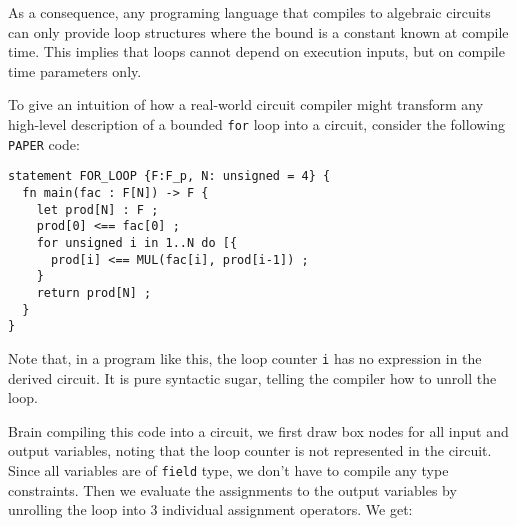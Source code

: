 As a consequence, any programing language that compiles to algebraic circuits can only provide loop structures where the bound is a constant known at compile time. This implies that loops cannot depend on execution inputs, but on compile time parameters only.  
\begin{example} To give an intuition of how a real-world circuit compiler might transform any high-level description of a bounded \texttt{for} loop into a circuit, consider the following \texttt{PAPER} code:
\begin{lstlisting}
statement FOR_LOOP {F:F_p, N: unsigned = 4} {
  fn main(fac : F[N]) -> F {
  	let prod[N] : F ;
  	prod[0] <== fac[0] ;
    for unsigned i in 1..N do [{
      prod[i] <== MUL(fac[i], prod[i-1]) ; 
    }
    return prod[N] ;
  }
}
\end{lstlisting}
Note that, in a program like this, the loop counter \texttt{i} has no expression in the derived circuit. It is pure syntactic sugar, telling the compiler how to unroll the loop.

Brain compiling this code into a circuit, we first draw box nodes for all input and output variables, noting that the loop counter is not represented in the circuit. Since all variables are of \texttt{field} type, we don't have to compile any type constraints. Then we evaluate the assignments to the output variables by unrolling the loop into $3$ individual assignment operators. We get:
\begin{center}
\end{center}
\end{example}
